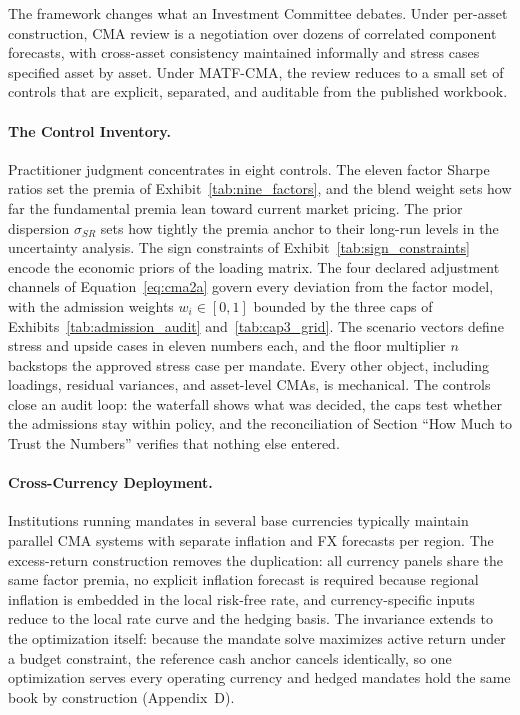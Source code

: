 \documentclass[pdftex,12pt,a4paper]{article}
\begin{document}
The framework changes what an Investment Committee debates. Under per-asset construction, CMA review is a negotiation over dozens of correlated component forecasts, with cross-asset consistency maintained informally and stress cases specified asset by asset. Under MATF-CMA, the review reduces to a small set of controls that are explicit, separated, and auditable from the published workbook.

\paragraph*{The Control Inventory.} Practitioner judgment concentrates in eight controls. The eleven factor Sharpe ratios set the premia of Exhibit~\ref{tab:nine_factors}, and the blend weight sets how far the fundamental premia lean toward current market pricing. The prior dispersion $\sigma_{SR}$ sets how tightly the premia anchor to their long-run levels in the uncertainty analysis. The sign constraints of Exhibit~\ref{tab:sign_constraints} encode the economic priors of the loading matrix. The four declared adjustment channels of Equation~\eqref{eq:cma2a} govern every deviation from the factor model, with the admission weights $w_i \in [0,1]$ bounded by the three caps of Exhibits~\ref{tab:admission_audit} and~\ref{tab:cap3_grid}. The scenario vectors define stress and upside cases in eleven numbers each, and the floor multiplier $n$ backstops the approved stress case per mandate. Every other object, including loadings, residual variances, and asset-level CMAs, is mechanical. The controls close an audit loop: the waterfall shows what was decided, the caps test whether the admissions stay within policy, and the reconciliation of Section ``How Much to Trust the Numbers'' verifies that nothing else entered.

\paragraph*{Cross-Currency Deployment.} Institutions running mandates in several base currencies typically maintain parallel CMA systems with separate inflation and FX forecasts per region. The excess-return construction removes the duplication: all currency panels share the same factor premia, no explicit inflation forecast is required because regional inflation is embedded in the local risk-free rate, and currency-specific inputs reduce to the local rate curve and the hedging basis. The invariance extends to the optimization itself: because the mandate solve maximizes active return under a budget constraint, the reference cash anchor cancels identically, so one optimization serves every operating currency and hedged mandates hold the same book by construction (Appendix~D).
\end{document}
